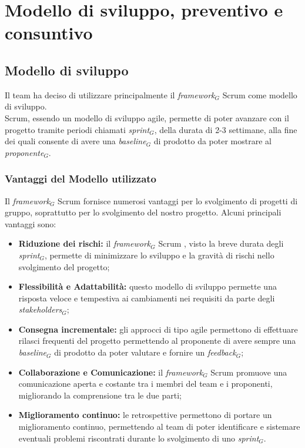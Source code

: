 \documentclass[12pt]{article}
\begin{document}
\section{Modello di sviluppo, preventivo e consuntivo}
\subsection{Modello di sviluppo}
Il team ha deciso di utilizzare principalmente il \textit{framework}$_G$ Scrum come modello di sviluppo.\\
Scrum, essendo un modello di sviluppo agile, permette di poter avanzare con il progetto tramite periodi chiamati \textit{sprint}$_G$, della durata di 2-3 settimane, alla fine dei quali consente di avere una \textit{baseline}$_G$ di prodotto da poter mostrare al \textit{proponente}$_G$.
\subsubsection{Vantaggi del Modello utilizzato}
Il \textit{framework}$_G$ Scrum fornisce numerosi vantaggi per lo svolgimento di progetti di gruppo, soprattutto per lo svolgimento del nostro progetto. Alcuni principali vantaggi sono:
\begin{itemize}
  \item \textbf{Riduzione dei rischi:} il \textit{framework}$_G$ Scrum , visto la breve durata degli \textit{sprint}$_G$, permette di minimizzare lo sviluppo e la gravità di rischi nello svolgimento del progetto;
  \item \textbf{Flessibilità e Adattabilità:} questo modello di sviluppo permette una risposta veloce e tempestiva ai cambiamenti nei requisiti da parte degli \textit{stakeholders}$_G$;
  \item \textbf{Consegna incrementale:} gli approcci di tipo agile permettono di effettuare rilasci frequenti del progetto permettendo al proponente di avere sempre una \textit{baseline}$_G$ di prodotto da poter valutare e fornire un \textit{feedback}$_G$;
  \item \textbf{Collaborazione e Comunicazione:} il \textit{framework}$_G$ Scrum promuove una comunicazione aperta e costante tra i membri del team e i proponenti, migliorando la comprensione tra le due parti;
  \item \textbf{Miglioramento continuo:} le retrospettive permettono di portare un miglioramento continuo, permettendo al team di poter identificare e sistemare eventuali problemi riscontrati durante lo svolgimento di uno \textit{sprint}$_G$.
\end{itemize}
\end{document}
